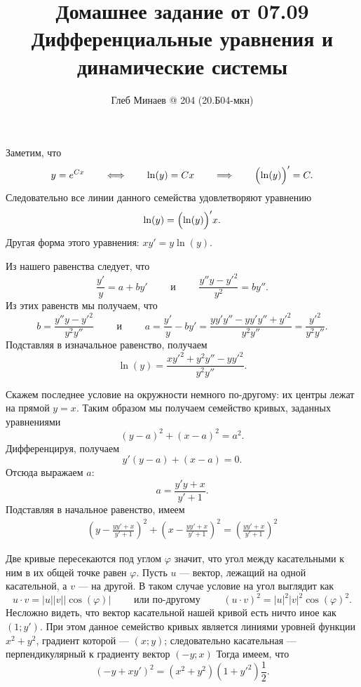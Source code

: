 \documentclass[12pt,a4paper]{article}
\title{Домашнее задание от 07.09\\Дифференциальные уравнения и динамические системы}
\author{Глеб Минаев @ 204 (20.Б04-мкн)}
\begin{document}
    \maketitle
    
    \begin{problem*}[17]
        Заметим, что
        \[
            y = e^{Cx}
            \qquad \Longleftrightarrow \qquad
            \ln(y) = Cx
            \qquad \Longrightarrow \qquad
            \Bigl(\ln(y)\Bigr)' = C.
        \]
        Следовательно все линии данного семейства удовлетворяют уравнению
        \[\ln(y) = \Bigl(\ln(y)\Bigr)' x.\]
        Другая форма этого уравнения: $x y' = y \ln(y)$.
    \end{problem*}

    \begin{problem*}[27]
        Из нашего равенства следует, что
        \[\frac{y'}{y} = a + by' \qquad \text{ и } \qquad \frac{y''y - {y'}^2}{y^2} = by''.\]
        Из этих равенств мы получаем, что
        \[b = \frac{y''y - {y'}^2}{y^2 y''} \qquad \text{ и } \qquad a = \frac{y'}{y} - by' = \frac{yy'y'' - yy'y'' + {y'}^2}{y^2y''} = \frac{{y'}^2}{y^2 y''}.\]
        Подставляя в изначальное равенство, получаем
        \[\ln(y) = \frac{x {y'}^2 + y^2 y'' - y {y'}^2}{y^2 y''}.\]
    \end{problem*}

    \begin{problem*}[32]
        Скажем последнее условие на окружности немного по-другому: их центры лежат на прямой $y = x$. Таким образом мы получаем семейство кривых, заданных уравнениями
        \[(y - a)^2 + (x - a)^2 = a^2.\]
        Дифференцируя, получаем
        \[y'(y-a) + (x-a) = 0.\]
        Отсюда выражаем $a$:
        \[a = \frac{y'y + x}{y' + 1}.\]
        Подставляя в начальное равенство, имеем
        \begin{align*}
            \left(y - \frac{yy' + x}{y' + 1}\right)^2 + \left(x - \frac{yy' + x}{y' + 1}\right)^2 = \left(\frac{yy' + x}{y' + 1}\right)^2
        \end{align*}
    \end{problem*}

    \begin{problem*}[40]
        Две кривые пересекаются под углом $\varphi$ значит, что угол между касательными к ним в их общей точке равен $\varphi$. Пусть $u$ --- вектор, лежащий на одной касательной, а $v$ --- на другой. В таком случае условие на угол выглядит как
        \[u \cdot v = |u| |v| |\cos(\varphi)| \qquad \text{ или по-другому } \qquad (u \cdot v)^2 = |u|^2 |v|^2 \cos(\varphi)^2.\]
        Несложно видеть, что вектор касательной нашей кривой есть ничто иное как $(1; y')$. При этом данное семейство кривых является линиями уровней функции $x^2 + y^2$, градиент которой --- $(x; y)$; следовательно касательная --- перпендикулярный к градиенту вектор $(-y; x)$ Тогда имеем, что
        \[(-y + xy')^2 = (x^2 + y^2) (1 + {y'}^2) \frac{1}{2}.\]
    \end{problem*}
\end{document}
